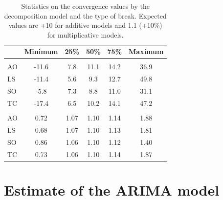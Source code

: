 \documentclass[12pt, a4paper]{article}
\begin{document}
\begin{table}[h]
\caption[Statistics on the convergence values by the decomposition model and the type of break. Expected values are +10 for additive models and 1.1 (+10\%) for multiplicative models]{Statistics on the convergence values by the decomposition model and the type of break. Expected values are +10 for additive models and 1.1 (+10\%) for multiplicative models.}\label{table:AOvaleur} 
\begin{center}
\begin{tabular}{lccccc}
\toprule
  & Minimum & 25\% & 50\% & 75\% & Maximum\\
\midrule
\addlinespace[0.3em]
\multicolumn{6}{l}{\textbf{Additive models}}\\
\hspace{1em}AO & -11.6 & 7.8 & 11.1 & 14.2 & 36.9\\
\hspace{1em}LS & -11.4 & 5.6 & 9.3 & 12.7 & 49.8\\
\hspace{1em}SO & -5.8 & 7.3 & 8.8 & 11.0 & 31.1\\
\hspace{1em}TC & -17.4 & 6.5 & 10.2 & 14.1 & 47.2\\
\addlinespace[0.3em]
\multicolumn{6}{l}{\textbf{Multiplicative models}}\\
\hspace{1em}AO & 0.72 & 1.07 & 1.10 & 1.14 & 1.88\\
\hspace{1em}LS & 0.68 & 1.07 & 1.10 & 1.13 & 1.81\\
\hspace{1em}SO & 0.86 & 1.06 & 1.10 & 1.12 & 1.40\\
\hspace{1em}TC & 0.73 & 1.06 & 1.10 & 1.14 & 1.87\\
\bottomrule
\end{tabular}
\end{center}
\end{table}


\clearpage

\section{Estimate of the ARIMA model}
\end{document}
